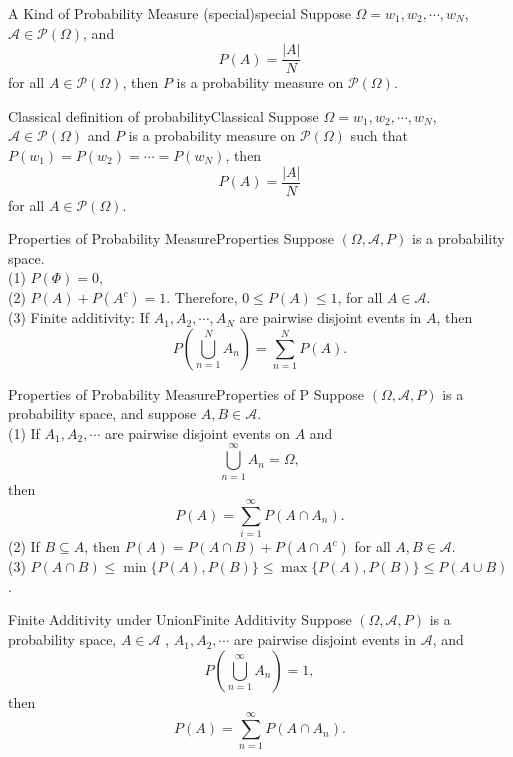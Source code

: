 \documentclass{elegantbook}
\newcommand\dis{\displaystyle}
\newcommand\ls{\leqslant}
\newcommand\sumi{\dis\sum\limits_{i=1}^{\infty}}
\newcommand\ma{\mathcal{A}}
\begin{document}
\begin{corollary}{A Kind of Probability Measure (special)}{special}
Suppose $\Omega={w_1,w_2,\cdots,w_N}$, $\ma\in\mathcal{P}(\Omega)$, and $$P(A)=\frac{|A|}{N}$$ for all $A\in\mathcal{P}(\Omega)$, then $P$ is a probability measure on $\mathcal{P}(\Omega)$.

\end{corollary}

\begin{theorem}{Classical definition of probability}{Classical}
Suppose $\Omega={w_1,w_2,\cdots,w_N}$, $\ma\in\mathcal{P}(\Omega)$ and $P$ is a probability measure on $\mathcal{P}(\Omega)$  such that $P({w_1})= P({w_2})=\cdots= P({w_N})$, then $$P(A)=\frac{|A|}{N}$$ for all $A\in\mathcal{P}(\Omega)$.

\end{theorem}

\begin{theorem}{Properties of Probability Measure}{Properties}
Suppose $(\Omega,\ma, P)$ is a probability space.\\
(1) $P(\Phi)=0,$\\
(2) $P(A)+P(A^c)=1$. Therefore, $0\ls P(A)\ls1$, for all $A\in\ma$.\\
(3) Finite additivity: If $A_1,A_2,\cdots,A_N$ are pairwise disjoint events in $A$,              then $$P\left(\bigcup_{n=1}^NA_n \right)=\sum_{n=1}^NP(A). $$

\end{theorem}

\begin{theorem}{Properties of Probability Measure}{Properties of P}
Suppose $(\Omega,\ma, P)$ is a probability space, and suppose $A,B\in\ma$.
\\
(1) If $A_1,A_2,\cdots$ are pairwise disjoint events on $A$ and 
$$ \bigcup_{n=1}^\infty A_n =\Omega,$$ then 
$$P(A)= \sumi P(A \cap A_n ).$$
(2) If $B\subseteq A$, then $P(A)=P(A\cap B)+P(A\cap A^c )$ for all $A,B\in\ma$.\\
(3) $P(A\cap B)  \ls \min \{P(A),P(B)\}  \ls \max\{ P(A),P(B)\} \ls  P(A\cup B)$.

\end{theorem}

\begin{corollary}{Finite Additivity under Union}{Finite Additivity}
Suppose $(\Omega,\ma, P)$ is a probability space, $A\in\ma$ , $A_1,A_2,\cdots$ are pairwise disjoint events in $\ma$, and $$P\left(\bigcup_{n=1}^\infty A_n \right)=1,$$ then 
$$P(A)=\sum_{n=1}^\infty P\left(A\cap A_n \right).$$ 

\end{corollary}
\end{document}
